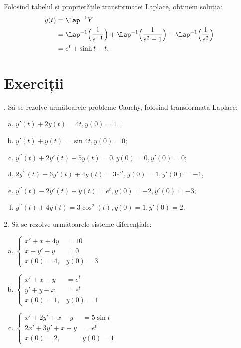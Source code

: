 Folosind tabelul și proprietățile transformatei Laplace, obținem soluția:
\begin{align*}
    y(t) &= \Lap^{-1} Y \\
         &= \Lap^{-1} \Big( \frac{1}{s^{-1}} \Big) + \Lap^{-1} \Big( \frac{1}{s^2 - 1} \Big) - %
         \Lap^{-1} \Big( \frac{1}{s^2} \Big) \\
         &= e^t + \sinh t - t.
\end{align*}

\vspace{0.3cm}


\section{Exerciții}

\indent{}. Să se rezolve următoarele probleme Cauchy, folosind transformata
Laplace:
\begin{enumerate}[(a)]
    \item $ y'(t) + 2y(t) = 4t, y(0) = 1 $ ;
    \item $ y'(t) + y(t) = \sin 4t, y(0) = 0 $;
    \item $ y^{\prime\prime}(t) + 2y'(t) + 5y(t) = 0, y(0) = 0, y'(0) = 0 $;
    \item $ 2y^{\prime\prime}(t) - 6y'(t) + 4y(t) = 3e^{3t}, y(0) = 1, y'(0) = -1 $;
    \item $ y^{\prime\prime}(t) - 2y'(t) + y(t) = e^t, y(0) = -2, y'(0) = -3 $;
    \item $ y^{\prime\prime}(t) + 4y(t) = 3\cos^2(t), y(0) = 1, y'(0) = 2 $.  
\end{enumerate}


\vspace{0.3cm}

2. Să se rezolve următoarele sisteme diferențiale:
\begin{enumerate}[(a)]
    \item $
        \begin{cases}
            x' + x + 4y &= 10 \\
            x - y' - y &= 0 \\
            x(0) = 4, & y(0) = 3
        \end{cases}
        $
    \item $
        \begin{cases}
            x' + x - y &= e^t \\
            y' + y - x &= e^t \\
            x(0) = 1, & y(0) = 1
        \end{cases}
        $
    \item $
        \begin{cases}
            x' + 2y' + x - y &= 5 \sin t \\
            2x' + 3y' + x - y &= e^t \\
            x(0) = 2, & y(0) = 1
        \end{cases}
        $
\end{enumerate}

